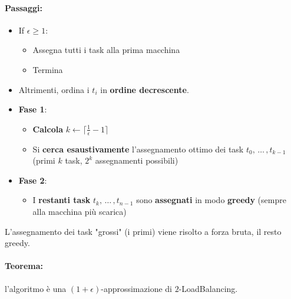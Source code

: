 \paragraph{Passaggi:}
\begin{itemize}
	\item If $\epsilon \geq 1$: 
	\begin{itemize}
		\item Assegna tutti i task alla prima macchina 
		\item Termina
	\end{itemize}
	\nn
	
	\item Altrimenti, ordina i $t_i$ in \textbf{ordine decrescente}.\\
	
	\item \textbf{Fase 1}:
	\begin{itemize}
		\item \textbf{Calcola} $k \leftarrow \lceil \frac{1}{\epsilon} -1 \rceil$
		\item Si \textbf{cerca esaustivamente} l'assegnamento ottimo dei task $t_0, \, \dots \, , t_{k-1}$ (primi $k$ task, $2^k$ assegnamenti possibili)
	\end{itemize}
	\nn
	
	\item \textbf{Fase 2}:
	\begin{itemize}
		\item I \textbf{restanti task}  $t_k, \, \dots \, , t_{n-1}$ sono \textbf{assegnati} in modo \textbf{greedy} (sempre alla macchina più scarica)
	\end{itemize}
	\nn
\end{itemize}

L'assegnamento dei task "grossi" (i primi) viene risolto a forza bruta, il resto greedy.\\

\paragraph{Teorema:} l'algoritmo è una $(1+ \epsilon)$-approssimazione di $2$-LoadBalancing.\\

